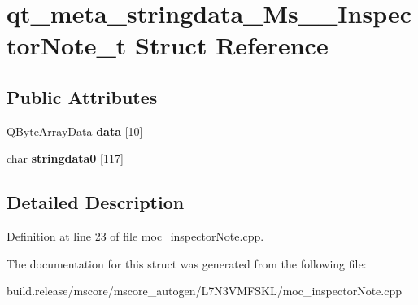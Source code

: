\hypertarget{structqt__meta__stringdata___ms_____inspector_note__t}{}\section{qt\+\_\+meta\+\_\+stringdata\+\_\+\+Ms\+\_\+\+\_\+\+Inspector\+Note\+\_\+t Struct Reference}
\label{structqt__meta__stringdata___ms_____inspector_note__t}
\subsection*{Public Attributes}
\begin{DoxyCompactItemize}
\item 
\mbox{\label{structqt__meta__stringdata___ms_____inspector_note__t_a36b49fb3982bf6bd45f3ea7bc3cd55f2}} 
Q\+Byte\+Array\+Data {\bfseries data} \mbox{[}10\mbox{]}
\item 
\mbox{\label{structqt__meta__stringdata___ms_____inspector_note__t_a38b4960c2ee38ab9e97740fcc8a48075}} 
char {\bfseries stringdata0} \mbox{[}117\mbox{]}
\end{DoxyCompactItemize}


\subsection{Detailed Description}


Definition at line 23 of file moc\+\_\+inspector\+Note.\+cpp.



The documentation for this struct was generated from the following file\+:\begin{DoxyCompactItemize}
\item 
build.\+release/mscore/mscore\+\_\+autogen/\+L7\+N3\+V\+M\+F\+S\+K\+L/moc\+\_\+inspector\+Note.\+cpp\end{DoxyCompactItemize}
